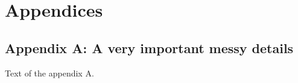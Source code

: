 \section*{Appendices}

\subsection*{Appendix A: A very important messy details}
Text of the appendix A.
